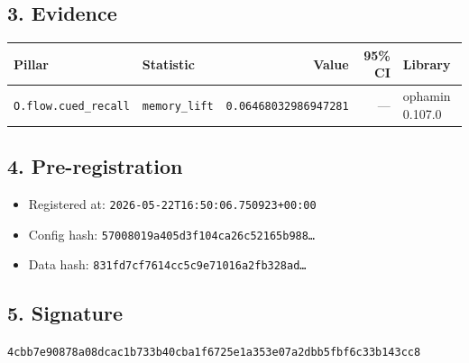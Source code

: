 \documentclass{article}
\begin{document}
\subsection*{3. Evidence}
\begin{tabular}{llrrl}\toprule
\textbf{Pillar} & \textbf{Statistic} & \textbf{Value} & \textbf{95\% CI} & \textbf{Library} \\\midrule
\texttt{O.flow.cued\_recall} & \texttt{memory\_lift} & \texttt{0.06468032986947281} & --- & ophamin 0.107.0 \\
\bottomrule\end{tabular}
\subsection*{4. Pre-registration}
\begin{itemize}
\item Registered at: \texttt{2026-05-22T16:50:06.750923+00:00}
\item Config hash: \texttt{57008019a405d3f104ca26c52165b988\dots}
\item Data hash: \texttt{831fd7cf7614cc5c9e71016a2fb328ad\dots}
\end{itemize}
\subsection*{5. Signature}
\texttt{4cbb7e90878a08dcac1b733b40cba1f6725e1a353e07a2dbb5fbf6c33b143cc8}\\
\end{document}

